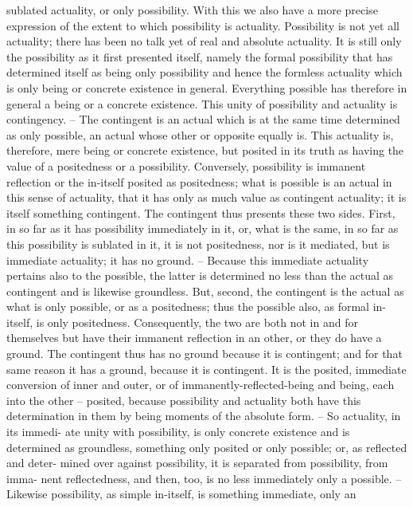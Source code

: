 sublated actuality, or only possibility.
With this we also have a more precise expression of the extent to which
possibility is actuality. Possibility is not yet all actuality; there has been no
talk yet of real and absolute actuality. It is still only the possibility as it first
presented itself, namely the formal possibility that has determined itself
as being only possibility and hence the formless actuality which is only
being or concrete existence in general. Everything possible has therefore in
general a being or a concrete existence.
This unity of possibility and actuality is contingency. – The contingent
is an actual which is at the same time determined as only possible, an
actual whose other or opposite equally is. This actuality is, therefore, mere
being or concrete existence, but posited in its truth as having the value of
a positedness or a possibility. Conversely, possibility is immanent reflection
or the in-itself posited as positedness; what is possible is an actual in this
sense of actuality, that it has only as much value as contingent actuality; it
is itself something contingent.
The contingent thus presents these two sides. First, in so far as it has
possibility immediately in it, or, what is the same, in so far as this possibility
is sublated in it, it is not positedness, nor is it mediated, but is immediate
actuality; it has no ground. – Because this immediate actuality pertains also
to the possible, the latter is determined no less than the actual as contingent
and is likewise groundless.
But, second, the contingent is the actual as what is only possible, or as
a positedness; thus the possible also, as formal in-itself, is only positedness.
Consequently, the two are both not in and for themselves but have their
immanent reflection in an other, or they do have a ground.
The contingent thus has no ground because it is contingent; and for
that same reason it has a ground, because it is contingent.
It is the posited, immediate conversion of inner and outer, or of
immanently-reflected-being and being, each into the other – posited,
because possibility and actuality both have this determination in them
by being moments of the absolute form. – So actuality, in its immedi-
ate unity with possibility, is only concrete existence and is determined as
groundless, something only posited or only possible; or, as reflected and deter-
mined over against possibility, it is separated from possibility, from imma-
nent reflectedness, and then, too, is no less immediately only a possible. –
Likewise possibility, as simple in-itself, is something immediate, only an
